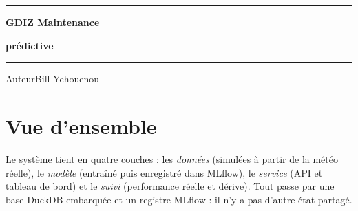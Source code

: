 \documentclass[11pt,a4paper]{article}
\begin{document}
\begin{titlepage}
\vspace*{5.2cm}
{\color{bleu}\rule{1.6cm}{1.1mm}}\par\vspace{0.9cm}
{\fontsize{36}{42}\selectfont\bfseries\color{encre}GDIZ Maintenance\par}
{\fontsize{36}{42}\selectfont\bfseries\color{bleu}prédictive\par}
\vfill
{\color{filet}\rule{\linewidth}{0.5pt}}\par\smallskip
{\small\textcolor{gris}{Auteur}\hspace{1.2em}Bill Yehouenou\par}
\end{titlepage}

\tableofcontents
\newpage

\section{Vue d'ensemble}

Le système tient en quatre couches : les \emph{données} (simulées à partir de la météo réelle), le \emph{modèle}
(entraîné puis enregistré dans MLflow), le \emph{service} (API et tableau de bord) et le \emph{suivi} (performance
réelle et dérive). Tout passe par une base DuckDB embarquée et un registre MLflow : il n'y a pas d'autre état partagé.
\end{document}
